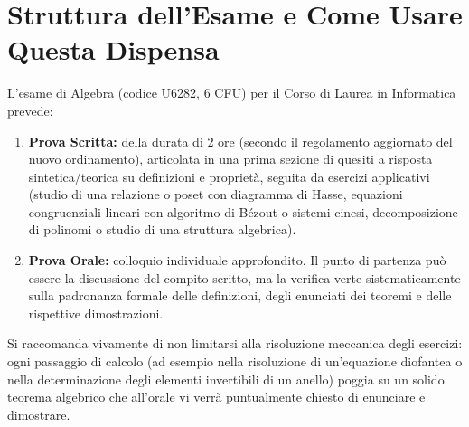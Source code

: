 \section*{Struttura dell'Esame e Come Usare Questa Dispensa}
L'esame di Algebra (codice U6282, 6 CFU) per il Corso di Laurea in Informatica prevede:
\begin{enumerate}
    \item \textbf{Prova Scritta:} della durata di 2 ore (secondo il regolamento aggiornato del nuovo ordinamento), articolata in una prima sezione di quesiti a risposta sintetica/teorica su definizioni e proprietà, seguita da esercizi applicativi (studio di una relazione o poset con diagramma di Hasse, equazioni congruenziali lineari con algoritmo di Bézout o sistemi cinesi, decomposizione di polinomi o studio di una struttura algebrica).
    \item \textbf{Prova Orale:} colloquio individuale approfondito. Il punto di partenza può essere la discussione del compito scritto, ma la verifica verte sistematicamente sulla padronanza formale delle definizioni, degli enunciati dei teoremi e delle rispettive dimostrazioni.
\end{enumerate}

Si raccomanda vivamente di non limitarsi alla risoluzione meccanica degli esercizi: ogni passaggio di calcolo (ad esempio nella risoluzione di un'equazione diofantea o nella determinazione degli elementi invertibili di un anello) poggia su un solido teorema algebrico che all'orale vi verrà puntualmente chiesto di enunciare e dimostrare.
